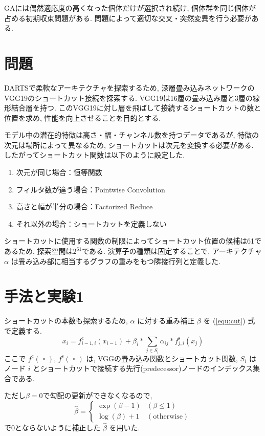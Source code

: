 \documentclass[twocolumn]{jarticle}     %
\begin{document}
GAには偶然適応度の高くなった個体だけが選択され続け,
個体群を同じ個体が占める初期収束問題がある.
問題によって適切な交叉・突然変異を行う必要がある.

\section{問題}
DARTSで柔軟なアーキテクチャを探索するため,
深層畳み込みネットワークのVGG19\cite{Simonyan15}のショートカット接続を探索する.
VGG19は16層の畳み込み層と3層の線形結合層を持つ.
このVGG19に対し層を飛ばして接続するショートカットの数と位置を求め,
性能を向上させることを目的とする.

モデル中の潜在的特徴は高さ・幅・チャンネル数を持つデータであるが,
特徴の次元は場所によって異なるため, ショートカットは次元を変換する必要がある.
したがってショートカット関数は以下のように設定した.
\begin{enumerate}
  \item 次元が同じ場合：恒等関数
  \item フィルタ数が違う場合：Pointwise Convolution
  \item 高さと幅が半分の場合：Factorized Reduce
  \item それ以外の場合：ショートカットを定義しない
\end{enumerate}
ショートカットに使用する関数の制限によってショートカット位置の候補は61であるため,
探索空間は$2^{61}$である.
演算子の種類は固定することで, アーキテクチャ $\alpha$ は畳み込み部に相当するグラフの重みをもつ隣接行列と定義した.

\section{手法と実験1}

ショートカットの本数も探索するため,
$\alpha$ に対する重み補正 $\beta$ を (\ref{equ:cut}) 式 で定義する.
\begin{equation}
  \label{equ:cut}
  x_i = f^{\mathrm{c}}_{i-1, i}(x_{i-1}) + \beta_i * \sum_{j \in S_i} \alpha_{ij} * f^{\mathrm{s}}_{j, i} (x_j)
\end{equation}
ここで $f^{\mathrm{c}}(・)$, $f^{\mathrm{s}}(・)$ は, VGGの畳み込み関数とショートカット関数,
$S_i$ はノード $i$ とショートカットで接続する先行(predecessor)ノードのインデックス集合である.

ただし$\beta=0$で勾配の更新ができなくなるので,
\begin{equation}
  \label{equ:beta}
  \hat{\beta} = \begin{cases}
    \exp(\beta - 1) & (\beta \leq 1) \\
    \log(\beta) + 1 & (\mathrm{otherwise})
  \end{cases}
\end{equation}
で0とならないように補正した $\hat{\beta}$ を用いた.
\end{document}
